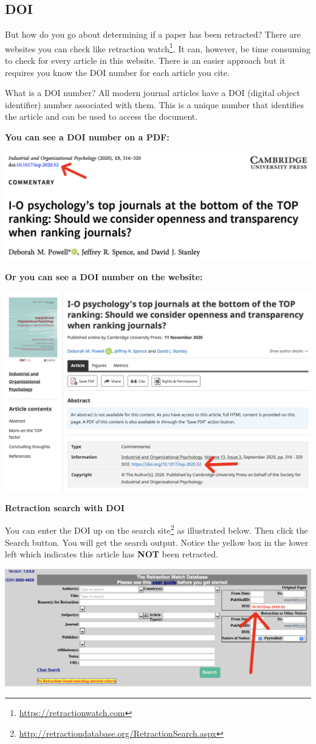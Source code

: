 \documentclass[
]{krantz}
\renewcommand{\href}[2]{#2\footnote{\url{#1}}}
\begin{document}
\hypertarget{doi}{%
\subsection{DOI}\label{doi}}

But how do you go about determining if a paper has been retracted? There are websites you can check like \href{https://retractionwatch.com}{retraction watch}. It can, however, be time consuming to check for every article in this website. There is an easier approach but it requires you know the DOI number for each article you cite.

What is a DOI number? All modern journal articles have a DOI (digital object identifier) number associated with them. This is a unique number that identifies the article and can be used to access the document.

\textbf{You can see a DOI number on a PDF:}

\includegraphics[width=0.6\linewidth]{ch_tools/images/doi_pdf}

\textbf{Or you can see a DOI number on the website:}

\includegraphics[width=0.6\linewidth]{ch_tools/images/doi_website}

\textbf{Retraction search with DOI}

You can enter the DOI up on the \href{http://retractiondatabase.org/RetractionSearch.aspx}{search site} as illustrated below. Then click the Search button. You will get the search output. Notice the yellow box in the lower left which indicates this article has \textbf{NOT} been retracted.

\includegraphics[width=0.6\linewidth]{ch_tools/images/doi_not_retracted}
\end{document}
